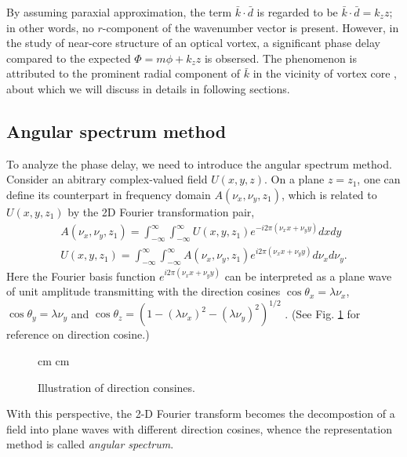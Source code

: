 By assuming paraxial approximation, the term $\bar{k} \cdot \bar{d}$ is regarded to be $\bar{k} \cdot \bar{d} = k_z z$; in other words, no $r$-component of the wavenumber vector is present. However, in the study of near-core structure of an optical vortex, a significant phase delay compared to the expected $\Phi = m\phi + k_z z$ is obsersed. The phenomenon is attributed to the prominent radial component of $\bar{k}$ in the vicinity of vortex core \cite{Near16}, about which we will discuss in details in following sections.

\subsection{Angular spectrum method}

To analyze the phase delay, we need to introduce the angular spectrum method. Consider an abitrary complex-valued field $U(x, y, z)$. On a plane $z = z_1$, one can define its counterpart in frequency domain $A(\nu_x, \nu_y, z_1)$, which is related to $U(x, y, z_1)$ by the 2D Fourier transformation pair,
\begin{eqnarray}
	A(\nu_x, \nu_y, z_1) = \int_{-\infty}^{\infty} \int_{-\infty}^{\infty} U(x, y, z_1)
	e^{-i 2 \pi (\nu_x x + \nu_y y)} dx dy
	\nonumber\\
	U(x, y, z_1) = \int_{-\infty}^{\infty} \int_{-\infty}^{\infty} A(\nu_x, \nu_y, z_1)
	e^{i 2 \pi (\nu_x x + \nu_y y)} d\nu_x d\nu_y.
	\nonumber
\end{eqnarray}
Here the Fourier basis function $e^{i2\pi (\nu_x x + \nu_y y)}$ can be interpreted as a plane wave of unit amplitude transmitting with the direction cosines $\cos\theta_x = \lambda \nu_x$, $\cos\theta_y = \lambda \nu_y$ and $\cos\theta_z = (1 - (\lambda \nu_x)^2 - (\lambda \nu_y)^2)^{1/2}$ \cite{Fo04}. (See Fig. \ref{fig:dirc_cos} for reference on direction cosine.)
\begin{figure}[h]
	 cm
	 cm
	\caption{Illustration of direction consines.}
	\label{fig:dirc_cos}
\end{figure}
With this perspective, the 2-D Fourier transform becomes the decompostion of a field into plane waves with different direction cosines, whence the representation method is called {\em angular spectrum}.



